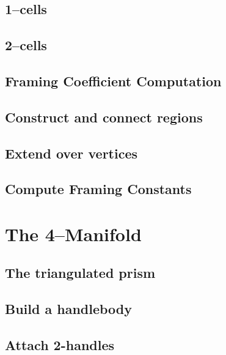 	\subsection{1--cells}
	\label{sub:one}
	
	
	\subsection{2--cells}
	\label{sub:two}
	
	
	\subsection{Framing Coefficient Computation}
	\label{sec:gleams}
	

	\subsection{Construct and connect regions}
	
	
	\subsection{Extend over vertices}
	
	
	\subsection{Compute Framing Constants}
	

\section{The 4--Manifold}
\label{sec:4man}

	\subsection{The triangulated prism}
	
	
	\subsection{Build a handlebody}
	
	
	\subsection{Attach 2-handles}
	

